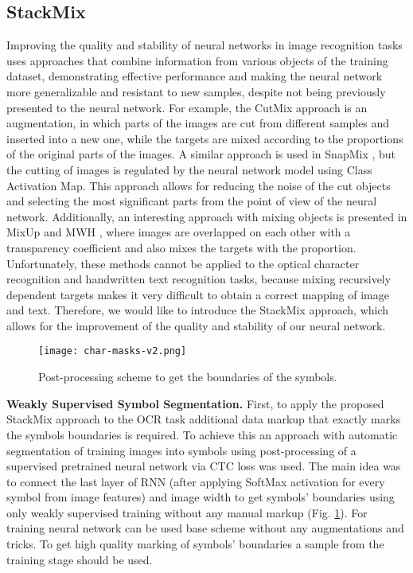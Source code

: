 \documentclass[10pt,twocolumn,letterpaper]{article}
\begin{document}
\subsection{StackMix}
Improving the quality and stability of neural networks in image recognition tasks uses approaches that combine information from various objects of the training dataset, demonstrating effective performance and making the neural network more generalizable and resistant to new samples, despite not being previously presented to the neural network. For example, the CutMix approach \cite{yun2019cutmix} is an augmentation, in which parts of the images are cut from different samples and inserted into a new one, while the targets are mixed according to the proportions of the original parts of the images. A similar approach is used in SnapMix \cite{huang2020snapmix}, but the cutting of images is regulated by the neural network model using Class Activation Map. This approach allows for reducing the noise of the cut objects and selecting the most significant parts from the point of view of the neural network. Additionally, an interesting approach with mixing objects is presented in MixUp \cite{zhang2018mixup} and MWH \cite{yu2021mixup}, where images are overlapped on each other with a transparency coefficient and also mixes the targets with the proportion. Unfortunately, these methods cannot be applied to the optical character recognition and handwritten text recognition tasks, because mixing recursively dependent targets makes it very difficult to obtain a correct mapping of image and text. Therefore, we would like to introduce the StackMix approach, which allows for the improvement of the quality and stability of our neural network.

\begin{figure}
\begin{center}
\texttt{[image: char-masks-v2.png]}
\end{center}
   \caption{Post-processing scheme to get the boundaries of the symbols.}
\label{fig:char-masks}
\end{figure}


\medskip
\noindent 
\textbf{Weakly Supervised Symbol Segmentation.} First, to apply the proposed StackMix approach to the OCR task additional data markup that exactly marks the symbols boundaries is required. To achieve this an approach with automatic segmentation of training images into symbols using post-processing of a supervised pretrained neural network via CTC loss was used. The main idea was to connect the last layer of RNN (after applying SoftMax activation for every symbol from image features) and image width to get symbols' boundaries using only weakly supervised training without any manual markup (Fig. \ref{fig:char-masks}). For training neural network can be used base scheme without any augmentations and tricks. To get high quality marking of symbols' boundaries a sample from the training stage should be used. 
\end{document}
